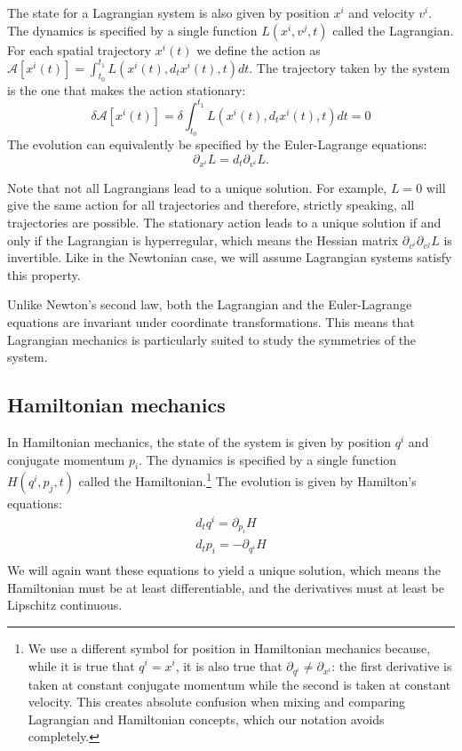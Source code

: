 The state for a Lagrangian system is also given by position $x^i$ and velocity $v^i$. The dynamics is specified by a single function $L(x^i, v^j, t)$ called the Lagrangian. For each spatial trajectory $x^i(t)$ we define the action as $\mathcal{A}[x^i(t)] = \int_{t_0}^{t_1} L(x^i(t), d_t x^i(t), t) dt$. The trajectory taken by the system is the one that makes the action stationary:
\begin{equation}
\delta \mathcal{A}[x^i(t)] = \delta \int_{t_0}^{t_1} L\left(x^i(t), d_t x^i(t), t\right) dt=0
\end{equation}
The evolution can equivalently be specified by the Euler-Lagrange equations:
\begin{equation}\label{rp-cm-EulerLagrange}
	\partial_{x^i}L=d_t \partial_{v^i} L.
\end{equation}

Note that not all Lagrangians lead to a unique solution. For example, $L=0$ will give the same action for all trajectories and therefore, strictly speaking, all trajectories are possible. The stationary action leads to a unique solution if and only if the Lagrangian is hyperregular, which means the Hessian matrix $\partial_{v^i}\partial_{v^j} L$ is invertible. Like in the Newtonian case, we will assume Lagrangian systems satisfy this property.

Unlike Newton's second law, both the Lagrangian and the Euler-Lagrange equations are invariant under coordinate transformations. This means that Lagrangian mechanics is particularly suited to study the symmetries of the system.

\subsection{Hamiltonian mechanics}

In Hamiltonian mechanics, the state of the system is given by position $q^i$ and conjugate momentum $p_i$. The dynamics is specified by a single function $H(q^i, p_j, t)$ called the Hamiltonian.\footnote{We use a different symbol for position in Hamiltonian mechanics because, while it is true that $q^i = x^i$, it is also true that $\partial_{q^i} \neq \partial_{x^i}$: the first derivative is taken at constant conjugate momentum while the second is taken at constant velocity. This creates absolute confusion when mixing and comparing Lagrangian and Hamiltonian concepts, which our notation avoids completely.} The evolution is given by Hamilton's equations:
\begin{equation}\label{rp-cm-HamiltonEq}
	\begin{aligned}
		d_t q^i = \partial_{p_i} H \\
		d_t p_i = - \partial_{q^i} H \\
	\end{aligned}
\end{equation}
We will again want these equations to yield a unique solution, which means the Hamiltonian must be at least differentiable, and the derivatives must at least be Lipschitz continuous.

